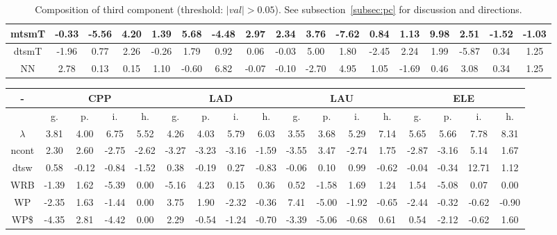 \documentclass[%
 aip,
 jmp,%
 amsmath,amssymb,
 reprint,%
 floatfix,
]{revtex4-1}
\begin{document}
\begin{table}
\begin{tabular}{|c|| c|c|c|c|| c|c|c|c|| c|c|c|c|| c|c|c|c|}
mtsmT & -0.33 & -5.56 & 4.20 & 1.39 & 5.68 & -4.48 & 2.97 & 2.34 & 3.76 & -7.62 & 0.84 & 1.13 & 9.98 & 2.51 & -1.52 & -1.03 \\\hline
dtsmT & -1.96 & 0.77 & 2.26 & -0.26 & 1.79 & 0.92 & 0.06 & -0.03 & 5.00 & 1.80 & -2.45 & 2.24 & 1.99 & -5.87 & 0.34 & 1.25 \\\hline
NN & 2.78 & 0.13 & 0.15 & 1.10 & -0.60 & 6.82 & -0.07 & -0.10 & -2.70 & 4.95 & 1.05 & -1.69 & 0.46 & 3.08 & 0.34 & 1.25 \\\hline
\end{tabular}
  \caption{Composition of third component (threshold: $|val|>0.05$). See subsection~\ref{subsec:pc} for discussion and directions.}\label{tab:pca3}
\end{table}


\begin{table}
\begin{tabular}{|c|| c|c|c|c|| c|c|c|c|| c|c|c|c|| c|c|c|c|}\hline
  \centering
    \scriptsize
\setlength{\tabcolsep}{.06667em}
-\-  & \multicolumn{4}{c|}{CPP} & \multicolumn{4}{c|}{LAD} & \multicolumn{4}{c|}{LAU} & \multicolumn{4}{c|}{ELE} \\ \hline\hline
 & g. & p. & i. & h. &     g. & p. & i. & h. &    g. & p. & i. & h. &    g. & p. & i. & h. \\\hline
$\lambda$ & 3.81 & 4.00 & 6.75 & 5.52 & 4.26 & 4.03 & 5.79 & 6.03 & 3.55 & 3.68 & 5.29 & 7.14 & 5.65 & 5.66 & 7.78 & 8.31 \\\hline
ncont & 2.30 & 2.60 & -2.75 & -2.62 & -3.27 & -3.23 & -3.16 & -1.59 & -3.55 & 3.47 & -2.74 & 1.75 & -2.87 & -3.16 & 5.14 & 1.67 \\\hline
dtsw & 0.58 & -0.12 & -0.84 & -1.52 & 0.38 & -0.19 & 0.27 & -0.83 & -0.06 & 0.10 & 0.99 & -0.62 & -0.04 & -0.34 & 12.71 & 1.12 \\\hline
WRB & -1.39 & 1.62 & -5.39 & 0.00 & -5.16 & 4.23 & 0.15 & 0.36 & 0.52 & -1.58 & 1.69 & 1.24 & 1.54 & -5.08 & 0.07 & 0.00 \\\hline
WP & -2.35 & 1.63 & -1.44 & 0.00 & 3.75 & 1.90 & -2.32 & -0.36 & 7.41 & -5.00 & -1.92 & -0.65 & -2.44 & -0.32 & -0.62 & -0.90 \\\hline
WP\$ & -4.35 & 2.81 & -4.42 & 0.00 & 2.29 & -0.54 & -1.24 & -0.70 & -3.39 & -5.06 & -0.68 & 0.61 & 0.54 & -2.12 & -0.62 & 1.60 \\\hline

\end{tabular}
\end{table}
\end{document}

